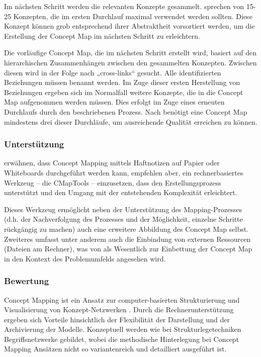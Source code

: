 Im nächsten Schritt werden die relevanten Konzepte gesammelt. \citet{Novak06} sprechen von 15-25 Konzepten, die im ersten Durchlauf maximal verwendet werden sollten. Diese Konzept können grob entsprechend ihrer Abstraktheit vorsortiert werden, um die Erstellung der Concept Map im nächsten Schritt zu erleichtern.

Die vorläufige Concept Map, die im nächsten Schritt erstellt wird, basiert auf den hierarchischen Zusammenhängen zwischen den gesammelten Konzepten. Zwischen diesen wird in der Folge nach „cross-links“ gesucht. Alle identifizierten Beziehungen müssen benannt werden. Im Zuge dieser ersten Herstellung von Beziehungen ergeben sich im Normalfall weitere Konzepte, die in die Concept Map aufgenommen werden müssen. Dies erfolgt im Zuge eines erneuten Durchlaufs durch den beschriebenen Prozess. Nach \citet{Novak06} benötigt eine Concept Map mindestens drei dieser Durchläufe, um ausreichende Qualität erreichen zu können.

\subsubsection{Unterstützung}

\citet{Novak06} erwähnen, dass Concept Mapping mittels Haftnotizen auf Papier oder Whiteboards durchgeführt werden kann, empfehlen aber, ein rechnerbasiertes Werkzeug -- die CMapTools \citep{Canas04} -- einzusetzen, dass den Erstellungsprozess unterstützt und den Umgang mit der entstehenden Komplexität erleichtert.

Dieses Werkzeug ermöglicht neben der Unterstützung des Mapping-Prozesses (d.h. der Nachverfolgung des Prozesses und der Möglichkeit, einzelne Schritte rückgängig zu machen) auch eine erweitere Abbildung des Concept Map selbst. Zweiteres umfasst unter anderem auch die Einbindung von externen Ressourcen (Dateien am Rechner), was von \citet{Novak06} als Wesentlich zur Einbettung der Concept Map in den Kontext des Problemumfelds angesehen wird.

\subsubsection{Bewertung}

Concept Mapping ist ein Ansatz zur computer-basierten Strukturierung und Visualisierung von Konzept-Netzwerken \citep{Novak06}. Durch die Rechnerunterstützung ergeben sich Vorteile hinsichtlich der Flexibilität der Darstellung und der Archivierung der Modelle. Konzeptuell werden wie bei Strukturlegetechniken Begriffsnetzwerke gebildet, wobei die methodische Hinterlegung bei Concept Mapping Ansätzen nicht so variantenreich und detailliert ausgeführt ist. 

